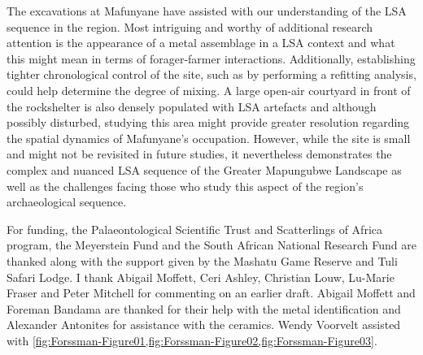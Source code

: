 The excavations at Mafunyane have assisted with our understanding of the LSA sequence in the region. Most intriguing and worthy of additional research attention is the appearance of a metal assemblage in a LSA context and what this might mean in terms of forager-farmer interactions. Additionally, establishing tighter chronological control of the site, such as by performing a refitting analysis, could help determine the degree of mixing. A large open-air courtyard in front of the rockshelter is also densely populated with LSA artefacts and although possibly disturbed, studying this area might provide greater resolution regarding the spatial dynamics of Mafunyane’s occupation. However, while the site is small and might not be revisited in future studies, it nevertheless demonstrates the complex and nuanced LSA sequence of the Greater Mapungubwe Landscape as well as the challenges facing those who study this aspect of the region’s archaeological sequence.

\myseparator

For  funding, the Palaeontological Scientific Trust and Scatterlings of Africa program, the Meyerstein Fund and the South African National Research Fund are thanked along with the support given by the Mashatu Game Reserve and Tuli Safari Lodge. I thank Abigail Moffett, Ceri Ashley, Christian Louw, Lu-Marie Fraser and Peter Mitchell for commenting on an earlier draft. Abigail Moffett and Foreman Bandama are thanked for their help with the metal identification and Alexander Antonites for assistance with the ceramics. Wendy Voorvelt assisted with \cref{fig:Forssman-Figure01,fig:Forssman-Figure02,fig:Forssman-Figure03}.




	
	\printbibliography[heading=subbibliography] 
	\label{Forssman:lastpage}
\closingarticle